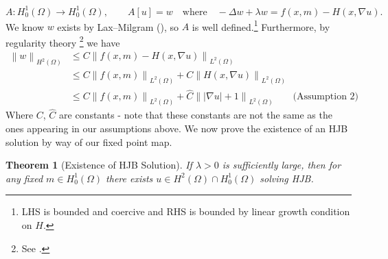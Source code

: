 \documentclass[11pt]{article}
\numberwithin{equation}{section}
\newtheorem{theorem}{Theorem}[section]
\theoremstyle{definition}
\theoremstyle{remark}
\newcommand{\Ltwo}{L^2(\Omega)}
\newcommand{\Honez}{H_0^1(\Omega)}
\newcommand{\norm}[1]{\left\lVert #1 \right\rVert}
\begin{document}
\[A:\Honez\to\Honez,\qquad A[u]=w \quad\text{where}\quad -\Delta w+\lambda w = f(x,m)-H(x,\nabla u).\]
We know $w$ exists by Lax--Milgram (), so $A$ is well defined.\footnote{LHS is bounded and coercive  and RHS is bounded by linear growth condition on $H$.} Furthermore, by regularity theory \footnote{See \cite[Section~6.3]{evans_pde}.} we have 
\begin{align*}
  \norm{w}_{H^2(\Omega)}
  & \le C \norm{f(x,m)-H(x,\nabla u)}_{\Ltwo}\\
  & \le C \norm{f(x,m)}_{\Ltwo} + C\norm{H(x,\nabla u)}_{\Ltwo}\\
  & \le C \norm{f(x,m)}_{\Ltwo} + \hat{C}\norm{|\nabla u| + 1}_{\Ltwo} \qquad \text{(Assumption 2)}
\end{align*}
Where $C$, $\hat{C}$ are constants - note that these constants are not the same as the 
ones appearing in our assumptions above.
We now prove the existence of an HJB solution by way of our fixed point map.
\begin{theorem}[Existence of HJB Solution]
  \label{thm:existence_hjb}  
  If $\lambda>0$ is sufficiently large, then for any fixed $m \in \Honez$ there exists $u\in H^2(\Omega)\cap \Honez$ solving HJB.
\end{theorem}
\end{document}
